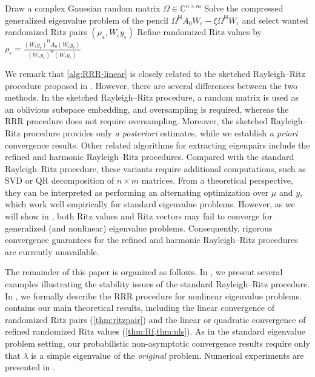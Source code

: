 \documentclass[a4paper,11pt]{article}
\newcommand{\Htran}{\mathsf{H}}
\newcommand{\C}{\mathbb{C}}
\begin{document}
\begin{algorithm2e}[H]
    \caption{RRR procedure for standard eigenvalue problems}
    \label{alg:RRR-linear}
    \KwIn{$A_{0}\in\C^{n\times n}$ and an orthonormal basis $W_{\epsilon}\in\C^{n\times m}$\;}
    Draw a complex Gaussian random matrix $\Omega\in\C^{n\times m}$\; 
    Solve the compressed generalized eigenvalue problem of the pencil $\Omega^{\Htran}A_{0}W_{\epsilon}-\xi \Omega^{\Htran}W_{\epsilon}$ and select wanted randomized Ritz pairs $(\mu_{\epsilon},W_{\epsilon}y_{\epsilon})$\;
    Refine randomized Ritz values by $\rho_{\epsilon} = \frac{(W_{\epsilon}y_{\epsilon})^{\Htran}A_{0}(W_{\epsilon}y_{\epsilon})}{(W_{\epsilon}y_{\epsilon})^{\Htran}(W_{\epsilon}y_{\epsilon})}$\;
\end{algorithm2e}

We remark that \cref{alg:RRR-linear} is closely related to the sketched Rayleigh--Ritz procedure proposed in \cite[Sec.~6]{Nakatsukasa2024}. However, there are several differences between the two methods. In the sketched Rayleigh--Ritz procedure, a random matrix is used as an oblivious subspace embedding, and oversampling is required, whereas the RRR procedure does not require oversampling. Moreover, the sketched Rayleigh--Ritz procedure provides only \emph{a posteriori} estimates, while we establish \emph{a priori} convergence results.
Other related algorithms for extracting eigenpairs include the refined \cite{Jia1997} and harmonic \cite{Morgan1991} Rayleigh--Ritz procedures. Compared with the standard Rayleigh--Ritz procedure, these variants require additional computations, such as SVD or QR decomposition of $n\times m$ matrices. From a theoretical perspective, they can be interpreted as performing an alternating optimization over $\mu$ and $y$, which work well empirically for standard eigenvalue problems. However, as we will show in , both Ritz values and Ritz vectors may fail to converge for generalized (and nonlinear) eigenvalue problems. Consequently, rigorous convergence guarantees for the refined and harmonic Rayleigh--Ritz procedures are currently unavailable.



The remainder of this paper is organized as follows.
In , we present several examples illustrating the stability issues of the standard Rayleigh--Ritz procedure.
In , we formally describe the RRR procedure for nonlinear eigenvalue problems.
 contains our main theoretical results, including the linear convergence of randomized Ritz pairs (\cref{thm:ritzpair}) and the linear or quadratic convergence of refined randomized Ritz values (\cref{thm:Rf,thm:nls}).
As in the standard eigenvalue problem setting, our probabilistic non-asymptotic convergence results require only that $\lambda$ is a simple eigenvalue of the \emph{original} problem.
Numerical experiments are presented in .
\end{document}
